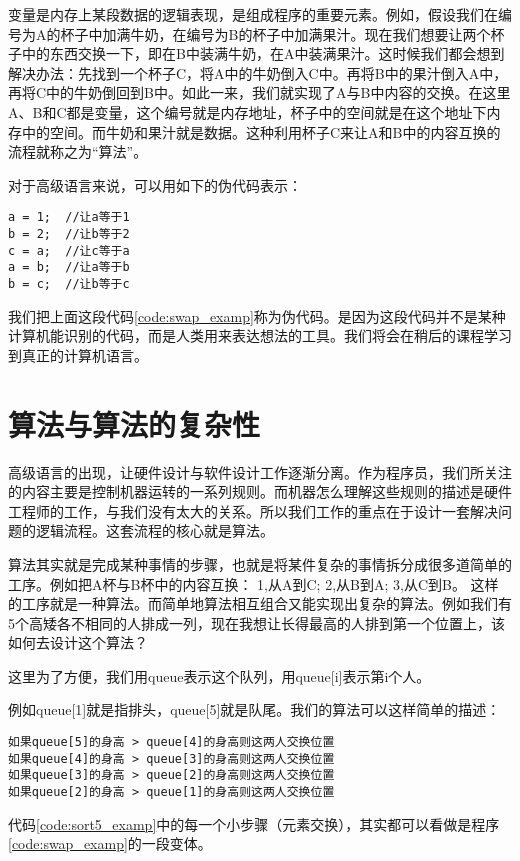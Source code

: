 变量是内存上某段数据的逻辑表现，是组成程序的重要元素。例如，假设我们在编号为A的杯子中加满牛奶，在编号为B的杯子中加满果汁。现在我们想要让两个杯子中的东西交换一下，即在B中装满牛奶，在A中装满果汁。这时候我们都会想到解决办法：先找到一个杯子C，将A中的牛奶倒入C中。再将B中的果汁倒入A中，再将C中的牛奶倒回到B中。如此一来，我们就实现了A与B中内容的交换。在这里A、B和C都是变量，这个编号就是内存地址，杯子中的空间就是在这个地址下内存中的空间。而牛奶和果汁就是数据。这种利用杯子C来让A和B中的内容互换的流程就称之为“算法”。

对于高级语言来说，可以用如下的伪代码表示：
\begin{lstlisting}[caption=两个变量交换数据,label=code:swap_examp]
a = 1;	//让a等于1
b = 2;	//让b等于2
c = a;	//让c等于a
a = b;	//让a等于b
b = c;	//让b等于c
\end{lstlisting}

我们把上面这段代码\ref{code:swap_examp}称为伪代码。是因为这段代码并不是某种计算机能识别的代码，而是人类用来表达想法的工具。我们将会在稍后的课程学习到真正的计算机语言。

\section{算法与算法的复杂性}

高级语言的出现，让硬件设计与软件设计工作逐渐分离。作为程序员，我们所关注的内容主要是控制机器运转的一系列规则。而机器怎么理解这些规则的描述是硬件工程师的工作，与我们没有太大的关系。所以我们工作的重点在于设计一套解决问题的逻辑流程。这套流程的核心就是算法。

算法其实就是完成某种事情的步骤，也就是将某件复杂的事情拆分成很多道简单的工序。例如把A杯与B杯中的内容互换：
1,从A到C;
2,从B到A; 
3,从C到B。
这样的工序就是一种算法。而简单地算法相互组合又能实现出复杂的算法。例如我们有5个高矮各不相同的人排成一列，现在我想让长得最高的人排到第一个位置上，该如何去设计这个算法？

这里为了方便，我们用queue表示这个队列，用queue[i]表示第i个人。

例如queue[1]就是指排头，queue[5]就是队尾。我们的算法可以这样简单的描述：

\begin{lstlisting}[caption=按身高排队,label=code:sort5_examp]
如果queue[5]的身高 > queue[4]的身高则这两人交换位置
如果queue[4]的身高 > queue[3]的身高则这两人交换位置
如果queue[3]的身高 > queue[2]的身高则这两人交换位置
如果queue[2]的身高 > queue[1]的身高则这两人交换位置
\end{lstlisting}

代码\ref{code:sort5_examp}中的每一个小步骤（元素交换），其实都可以看做是程序\ref{code:swap_examp}的一段变体。

